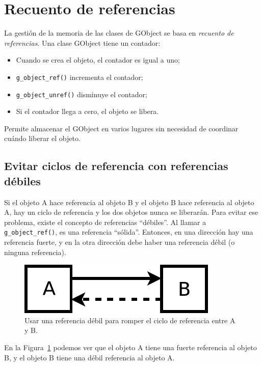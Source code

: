 \section{Recuento de referencias}

La gestión de la memoria de las clases de GObject se basa en \emph{recuento de referencias}. Una clase GObject tiene un contador:
\begin{itemize}
    \item Cuando se crea el objeto, el contador es igual a uno;
    \item \lstinline{g_object_ref()} incrementa el contador;
    \item \lstinline{g_object_unref()} disminuye el contador;
    \item Si el contador llega a cero, el objeto se libera.
\end{itemize}

Permite almacenar el GObject en varios lugares sin necesidad de coordinar cuándo liberar el objeto.

\subsection{Evitar ciclos de referencia con referencias débiles}

Si el objeto A hace referencia al objeto B y el objeto B hace referencia al objeto A, hay un ciclo de referencia y los dos objetos nunca se liberarán. Para evitar ese problema, existe el concepto de referencias ``débiles''. Al llamar a \lstinline{g_object_ref()}, es una referencia ``sólida''. Entonces, en una dirección hay una referencia fuerte, y en la otra dirección debe haber una referencia débil (o ninguna referencia).

\begin{figure}[H]
  \begin{center}
    \includegraphics[scale=0.75]{assets/img/weak-ref.pdf}
    \caption{Usar una referencia débil para romper el ciclo de referencia entre A y B.}
    \label{oop-gobject-weak-ref-schema}
  \end{center}
\end{figure}

En la Figura~\ref{oop-gobject-weak-ref-schema} podemos ver que el objeto A tiene una fuerte referencia al objeto B, y el objeto B tiene una débil referencia al objeto A.

